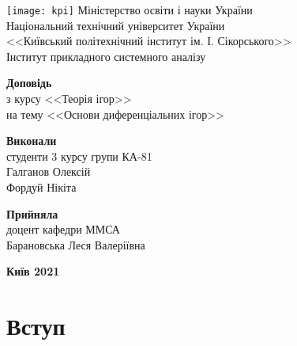\documentclass{report}
\begin{document}
\begin{titlepage}
    \thispagestyle{empty}
    \begin{center}
        \texttt{[image: kpi]}
        Міністерство освіти і науки України\\
        Національний технічний університет України\\
        <<Київський політехнічний інститут ім. І. Сікорського>>\\
        Інститут прикладного системного аналізу
    \end{center}
    \vspace{30mm}
    \begin{center}
        \fontsize{22}{26}\selectfont\textbf{Доповідь} \\
        з курсу <<Теорія ігор>> \\
        на тему <<Основи диференціальних ігор>>
    \end{center}
    \vspace{30mm}
    \begin{flushleft}
        \textbf{Виконали} \\ 
        студенти 3 курсу групи КА-81 \\
        Галганов Олексій \\
        Фордуй Нікіта
    \end{flushleft}
    \begin{flushright}
        \textbf{Прийняла} \\
        доцент кафедри ММСА \\
        Барановська Леся Валеріївна
    \end{flushright}
    \vspace{30mm}
    \begin{center}
        \textbf{Київ 2021}
    \end{center}
\end{titlepage}
\tableofcontents
    \chapter{Вступ}
        
\end{document}

